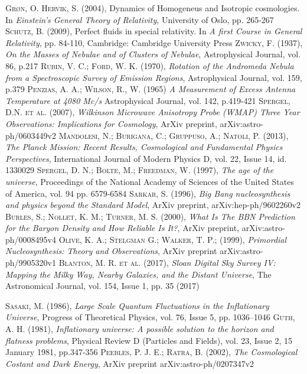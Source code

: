\documentclass[a4paper,openright,10pt, oneside, final]{book}
\begin{document}
\begin{thebibliography}{a}
 \textsc{ Grøn, O. Hervik, S. (2004)},
Dynamics of Homogeneus and Isotropic cosmologies. In
\textit{Einstein's General Theory of Relativity},
University of Oslo, pp. 265-267
 \textsc{Schutz, B. (2009)},
Perfect fluids in special relativity. In 
\textit{A first Course in General Relativity},
pp. 84-110, Cambridge: Cambridge University Press
 \textsc{Zwicky, F. (1937)},
\textit{On the Masses of Nebulae and of Clusters of Nebulae},
Astrophysical Journal, vol. 86, p.217
 \textsc{Rubin, V. C.; Ford, W. K. (1970)},
\textit{Rotation of the Andromeda Nebula from a Spectroscopic Survey of Emission Regions},
Astrophysical Journal, vol. 159, p.379 
 \textsc{Penzias, A. A.; Wilson, R., W. (1965)}
\textit{A Measurement of Excess Antenna Temperature at 4080 Mc/s}
Astrophysical Journal, vol. 142, p.419-421
 \textsc{Spergel, D.N. et al. (2007)},
\textit{Wilkinson Microwave Anisotropy Probe (WMAP) Three Year
Observations: Implications for Cosmology},
ArXiv preprint, arXiv:astro-ph/0603449v2
 \textsc{Mandolesi, N.; Burigana, C.; Gruppuso, A.; Natoli, P. (2013)},
\textit{The Planck Mission: Recent Results, Cosmological and Fundamental Physics Perspectives},
International Journal of Modern Physics D, vol. 22, Issue 14, id. 1330029
 \textsc{Spergel, D. N.; Bolte, M.; Freedman, W. (1997)},
\textit{The age of the universe},
Proceedings of the National Academy of Sciences of the United States of America, vol. 94 pp. 6579-6584
 \textsc{Sarkar, S. (1996)},
\textit{Big Bang nucleosynthesis and physics beyond the Standard Model},
ArXiv preprint, arXiv:hep-ph/9602260v2
 \textsc{Burles, S.; Nollet, K. M.; Turner, M. S. (2000)},
\textit{What Is The BBN Prediction for the Baryon Density and How Reliable Is It?},
ArXiv preprint, arXiv:astro-ph/0008495v4
 \textsc{Olive, K. A.; Stelgman G.; Walker, T. P.; (1999)},
\textit{Primordial Nucleosynthesis: Theory and Observations},
ArXiv preprint arXiv:astro-ph/9905320v1 
 \textsc{Blanton, M. R. et al. (2017)},
\textit{Sloan Digital Sky Survey IV: Mapping the Milky Way, Nearby Galaxies, and the Distant Universe},
The Astronomical Journal, vol. 154, Issue 1, pp. 35 (2017)

 \textsc{Sasaki, M. (1986)},
\textit{Large Scale Quantum Fluctuations in the Inflationary Universe},
Progress of Theoretical Physics, vol. 76, Issue 5, pp. 1036–1046
 \textsc{Guth, A. H. (1981)},
\textit{Inflationary universe: A possible solution to the horizon and flatness problems},
Physical Review D (Particles and Fields), vol. 23, Issue 2, 15 January 1981, pp.347-356
 \textsc{Peebles, P. J. E.; Ratra, B. (2002)},
\textit{The Cosmological Costant and Dark Energy},
ArXiv preprint arXiv:astro-ph/0207347v2


\end{thebibliography}
\end{document}
